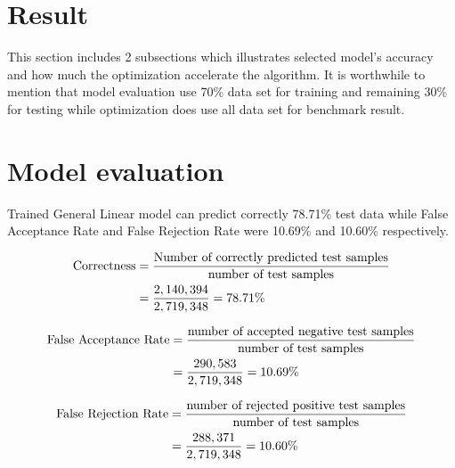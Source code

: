 \documentclass[English]{dicomopapers}
\begin{document}
\section{Result}
 This section includes 2 subsections which illustrates selected model's accuracy and how much the optimization accelerate the algorithm. It is worthwhile to mention that model evaluation use 70\% data set for training and remaining 30\% for testing while optimization does use all data set for benchmark result.
\section{Model evaluation}
 Trained General Linear model can predict correctly 78.71\% test data while False Acceptance Rate and False Rejection Rate were 10.69\% and 10.60\% respectively.
\begin{center}
  \begin{equation}
    \notag
    \begin{aligned}
      \text{Correctness} &= \frac{\text{Number of correctly predicted test samples}}{\text{number of test samples}} \\
      &= \frac{2,140,394}{2,719,348}=78.71\%
    \end{aligned}
  \end{equation}
\end{center}
\begin{center}
  \begin{equation}
    \notag
    \begin{aligned}
      \text{False Acceptance Rate} &= \frac{\text{number of accepted negative test samples}}{\text{number of test samples}} \\
      &= \frac{290,583}{2,719,348}=10.69\%
    \end{aligned}
  \end{equation}
\end{center}
\begin{center}
  \begin{equation}
    \notag
    \begin{aligned}
      \text{False Rejection Rate} &= \frac{\text{number of rejected positive test samples}}{\text{number of test samples}} \\
      &= \frac{288,371}{2,719,348}=10.60\%
    \end{aligned}
  \end{equation}
\end{center}
\end{document}
